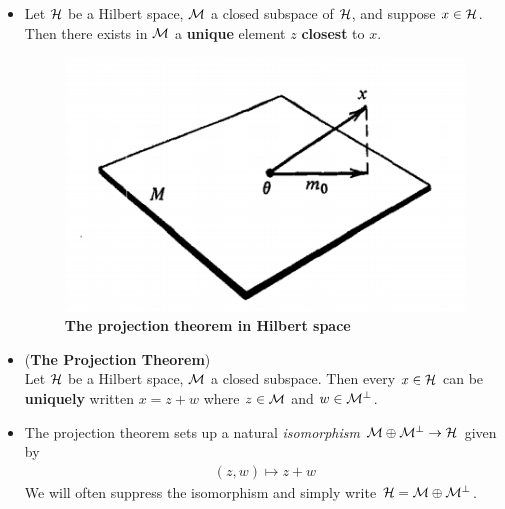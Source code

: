 \documentclass[11pt]{article}
\begin{document}
\begin{itemize}
\item \begin{lemma}
Let ${\mathcal H}$ be a Hilbert space, ${\mathcal M}$ a closed subspace of ${\mathcal H}$, and suppose $x \in {\mathcal H}$. Then there exists in ${\mathcal M}$ a \textbf{unique} element $z$ \textbf{closest} to $x$.
\end{lemma}

\begin{figure}
\begin{minipage}[t]{1\linewidth}
  \centering
  \centerline{\includegraphics[scale = 0.6]{projection_theorem_hilbert.png}}
\end{minipage}
\caption{\footnotesize{\textbf{The projection theorem in Hilbert space \citep{luenberger1997optimization}}}}
\label{fig: projection_theorem_hilbert}
\end{figure}

\item \begin{theorem} (\textbf{The Projection Theorem})\\
Let ${\mathcal H}$ be a Hilbert space, ${\mathcal M}$ a closed subspace. Then every $x \in {\mathcal H}$ can be \textbf{uniquely} written $x = z + w$ where $z \in {\mathcal M}$ and $w \in {\mathcal M}^{\bot}$.
\end{theorem}

\item \begin{remark}
The projection theorem sets up a natural \emph{isomorphism} ${\mathcal M} \oplus {\mathcal M}^{\bot} \rightarrow {\mathcal H} $ given by
\begin{align*}
(z, w) \mapsto z + w
\end{align*}
We will often suppress the isomorphism and simply write ${\mathcal H} = {\mathcal M} \oplus {\mathcal M}^{\bot}$.
\end{remark}

\end{itemize}
\end{document}
